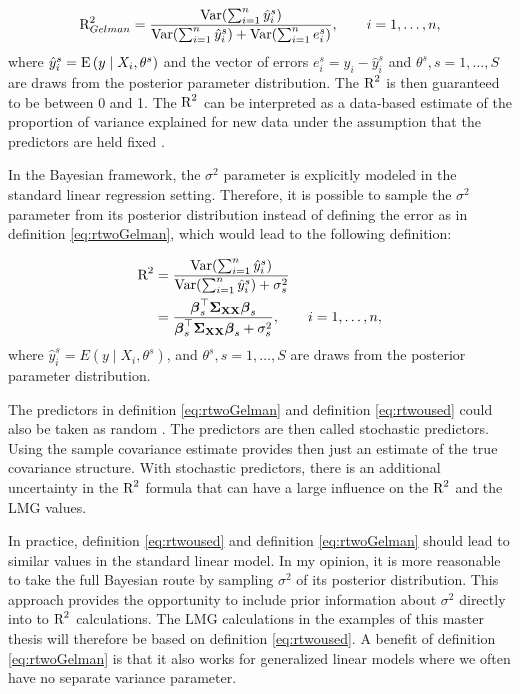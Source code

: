\documentclass[11pt,a4paper,twoside]{book}\usepackage[]{graphicx}\usepackage[]{color}
\begin{document}
      \begin{align} 
       \text{R}^2_{Gelman} = \frac{\operatorname{Var}(\sum_{i=1}^{n}\hat{y}^s_{i})}{\operatorname{Var}(\sum_{i=1}^{n}\hat{y}^s_{i})+\operatorname{Var}(\sum_{i=1}^{n}e^s_{i})}, \qquad i = 1,\dots,n, \label{eq:rtwoGelman} 
   \end{align} 
where $\hat{y}^s_{i}  = \operatorname{E} \left({y \mid X_{i}, \theta^s}\right) $ and the vector of errors $e^s_{i} = y_{i} - \hat{y}^s_{i}$ and $\theta^s, s = 1,\dotsc, S$ are draws from the posterior parameter distribution. The $\text{R}^2$ is then guaranteed to be between 0 and 1. The $\text{R}^2$ can  be interpreted as a data-based estimate of the proportion of variance explained for new data under the assumption that the predictors are held fixed \citep{Gelman2017}.

In the Bayesian framework, the $\sigma^2$ parameter is explicitly modeled in the standard linear regression setting. Therefore, it is possible to sample the $\sigma^2$ parameter from its posterior distribution instead of defining the error as in definition \eqref{eq:rtwoGelman}, which would lead to the following definition:

    \begin{align} 
        \text{R}^2 &= \frac{\operatorname{Var}(\sum_{i=1}^{n}\hat{y}^s_{i})}{\operatorname{Var}(\sum_{i=1}^{n}\hat{y}^s_{i})+\sigma_{s}^2} \nonumber \\ &= \frac{{\boldsymbol{\beta}}_{s}^\top {\boldsymbol{\Sigma}}{}_{{\mathbf{X}} {\mathbf{X}}}  {\boldsymbol{\beta}}_{s}}{{\boldsymbol{\beta}}_{s}^\top {\boldsymbol{\Sigma}}{}_{{\mathbf{X}} {\mathbf{X}}}  {\boldsymbol{\beta}}_{s}+\sigma_{s}^2}, \qquad i = 1,\dots,n, \label{eq:rtwoused} 
   \end{align} 
 where $\hat{y}^s_{i}  = E \left({y \mid X_{i}, \theta^s}\right) $,  and $\theta^s, s = 1,\dotsc, S$ are draws from the posterior parameter distribution.


The predictors in definition \eqref{eq:rtwoGelman} and definition \eqref{eq:rtwoused} could also be taken as random \citep{Gelman2017}. The predictors are then called stochastic predictors. Using the sample covariance estimate provides then just an estimate of the true covariance structure. With stochastic predictors, there is an additional uncertainty in the $\text{R}^2$ formula that can have a large influence on the $\text{R}^2$ and the LMG values.

In practice, definition \eqref{eq:rtwoused} and definition \eqref{eq:rtwoGelman} should lead to  similar values in the standard linear model. In my opinion, it is more reasonable to take the full Bayesian route by sampling  $\sigma^2$ of its posterior distribution. This approach provides the opportunity to include prior information about $\sigma^2$ directly into to $\text{R}^2$ calculations. The LMG calculations in the examples of this master thesis will therefore be based on definition \eqref{eq:rtwoused}.  A benefit of definition \eqref{eq:rtwoGelman} is that it also works for generalized linear models where we often have no separate variance parameter.
\end{document}
